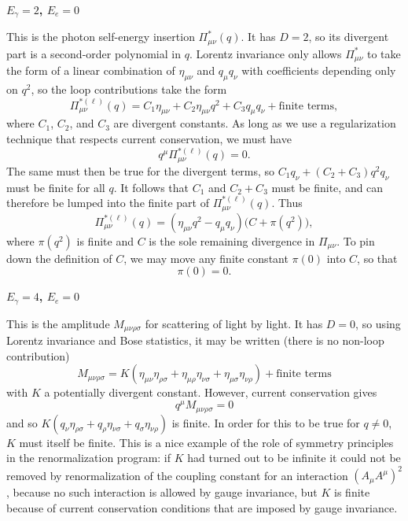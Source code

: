 \par\noindent\textbf{$E_\gamma=2$, $E_e=0$}\par
This is the photon self-energy insertion $\Pi_{\mu\nu}^*(q)$. It has $D=2$,
so its divergent part is a second-order polynomial in $q$. Lorentz invariance
only allows $\Pi_{\mu\nu}^*$ to take the form of a linear combination of
$\eta_{\mu\nu}$ and $q_\mu q_\nu$ with coefficients depending only on $q^2$,
so the loop contributions take the form
\[
  \Pi_{\mu\nu}^{*(\ell)}(q)
  =C_1\eta_{\mu\nu}+C_2\eta_{\mu\nu}q^2+C_3q_\mu q_\nu
  +\text{finite terms},
\]
where $C_1$, $C_2$, and $C_3$ are divergent constants. As long as we use a
regularization technique that respects current conservation, we must have
\[
  q^\mu\Pi_{\mu\nu}^{*(\ell)}(q)=0.
\]
The same must then be true for the divergent terms, so
$C_1q_\nu+(C_2+C_3)q^2q_\nu$ must be finite for all $q$. It follows that
$C_1$ and $C_2+C_3$ must be finite, and can therefore be lumped into the
finite part of $\Pi_{\mu\nu}^{*(\ell)}(q)$. Thus
\begin{equation}
  \Pi_{\mu\nu}^{*(\ell)}(q)
  =(\eta_{\mu\nu}q^2-q_\mu q_\nu)\bigl(C+\pi(q^2)\bigr),
  \tag{12.2.7}\label{eq:12.2.7}
\end{equation}
where $\pi(q^2)$ is finite and $C$ is the sole remaining divergence in
$\Pi_{\mu\nu}$. To pin down the definition of $C$, we may move any finite
constant $\pi(0)$ into $C$, so that
\begin{equation}
  \pi(0)=0.
  \tag{12.2.8}\label{eq:12.2.8}
\end{equation}

\par\noindent\textbf{$E_\gamma=4$, $E_e=0$}\par
This is the amplitude $M_{\mu\nu\rho\sigma}$ for scattering of light by
light. It has $D=0$, so using Lorentz invariance and Bose statistics, it may
be written (there is no non-loop contribution)
\[
  M_{\mu\nu\rho\sigma}
  =K(\eta_{\mu\nu}\eta_{\rho\sigma}
     +\eta_{\mu\rho}\eta_{\nu\sigma}
     +\eta_{\mu\sigma}\eta_{\nu\rho})+\text{finite terms}
\]
with $K$ a potentially divergent constant. However, current conservation
gives
\[
  q^\mu M_{\mu\nu\rho\sigma}=0
\]
and so $K(q_\nu\eta_{\rho\sigma}+q_\rho\eta_{\nu\sigma}
+q_\sigma\eta_{\nu\rho})$ is finite. In order for this to be true for
$q\neq0$, $K$ must itself be finite. This is a nice example of the role of
symmetry principles in the renormalization program: if $K$ had turned out
to be infinite it could not be removed by renormalization of the coupling
constant for an interaction $(A_\mu A^\mu)^2$, because no such interaction
is allowed by gauge invariance, but $K$ is finite because of current
conservation conditions that are imposed by gauge invariance.

